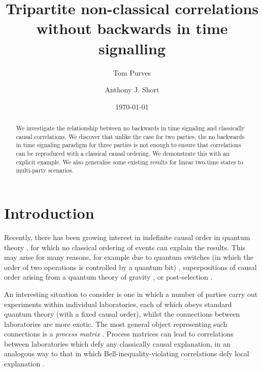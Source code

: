 \documentclass[aps,pra, twocolumn]{revtex4-1}
\begin{document}
\title{Tripartite non-classical correlations without backwards in time signalling }
\date{\today}
\author{Tom Purves} 
\author{Anthony J. Short} 



\begin{abstract}
We investigate the relationship between no backwards in time signaling and classically causal correlations. We discover that unlike the case for two parties, the no backwards in time signaling paradigm for three parties is not enough to ensure that correlations can be reproduced with a classical causal ordering. We demonstrate this with an explicit example. We also generalise some existing results for linear two-time states to multi-party scenarios.  
\end{abstract}


\maketitle

\section{Introduction} 

Recently, there has been growing interest in indefinite causal order in quantum theory \cite{Aharonov1990, Oreshkov2012, Chiribella2013, Leifer2013, Baumeler2014, Branciard2016, Allen2017}, for which no classical ordering of events can explain the results. This may arise for many reasons, for example due to quantum switches (in which the order of two operations is controlled by a quantum bit) \cite{Chiribella2013, qswitch, witnessing},  superpositions of causal order arising from a  quantum theory of gravity \cite{hardyqgrav, Hardy2009, Zych2017}, or post-selection \cite{Aharonov1964, Aharonov1991, Aharonov2009,  Silva2014, connectingprocesandtwotime, polytope}. 

An interesting situation to consider is one in which a number of parties carry out experiments within individual laboratories, each of which obeys standard quantum theory (with a fixed causal order), whilst the connections between laboratories are more exotic. The most general object representing such connections is a \emph{process matrix} \cite{Oreshkov2012, Branciard2016, Oreshkov2016, Abbott2016, Baumeler2016, computationwithcausality}. Process matrices can lead to correlations between laboratories which defy any classically causal explanation, in an analogous way to that in which Bell-inequality-violating correlations defy local explanation \cite{bell}.
\end{document}

